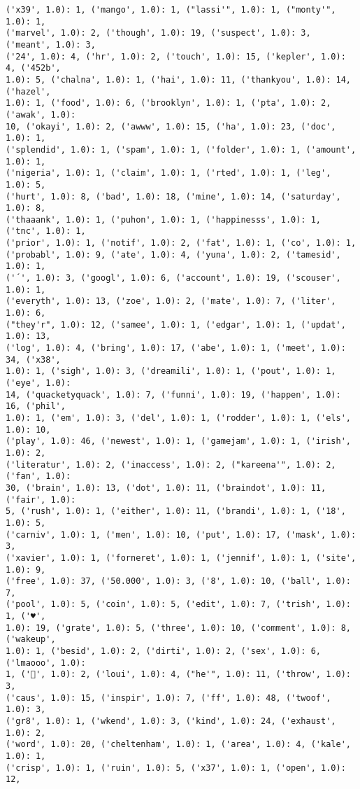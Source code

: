 \documentclass[11pt]{article}
\begin{document}
\begin{Verbatim}[commandchars=\\\{\}]
('x39', 1.0): 1, ('mango', 1.0): 1, ("lassi'", 1.0): 1, ("monty'", 1.0): 1,
('marvel', 1.0): 2, ('though', 1.0): 19, ('suspect', 1.0): 3, ('meant', 1.0): 3,
('24', 1.0): 4, ('hr', 1.0): 2, ('touch', 1.0): 15, ('kepler', 1.0): 4, ('452b',
1.0): 5, ('chalna', 1.0): 1, ('hai', 1.0): 11, ('thankyou', 1.0): 14, ('hazel',
1.0): 1, ('food', 1.0): 6, ('brooklyn', 1.0): 1, ('pta', 1.0): 2, ('awak', 1.0):
10, ('okayi', 1.0): 2, ('awww', 1.0): 15, ('ha', 1.0): 23, ('doc', 1.0): 1,
('splendid', 1.0): 1, ('spam', 1.0): 1, ('folder', 1.0): 1, ('amount', 1.0): 1,
('nigeria', 1.0): 1, ('claim', 1.0): 1, ('rted', 1.0): 1, ('leg', 1.0): 5,
('hurt', 1.0): 8, ('bad', 1.0): 18, ('mine', 1.0): 14, ('saturday', 1.0): 8,
('thaaank', 1.0): 1, ('puhon', 1.0): 1, ('happinesss', 1.0): 1, ('tnc', 1.0): 1,
('prior', 1.0): 1, ('notif', 1.0): 2, ('fat', 1.0): 1, ('co', 1.0): 1,
('probabl', 1.0): 9, ('ate', 1.0): 4, ('yuna', 1.0): 2, ('tamesid', 1.0): 1,
('´', 1.0): 3, ('googl', 1.0): 6, ('account', 1.0): 19, ('scouser', 1.0): 1,
('everyth', 1.0): 13, ('zoe', 1.0): 2, ('mate', 1.0): 7, ('liter', 1.0): 6,
("they'r", 1.0): 12, ('samee', 1.0): 1, ('edgar', 1.0): 1, ('updat', 1.0): 13,
('log', 1.0): 4, ('bring', 1.0): 17, ('abe', 1.0): 1, ('meet', 1.0): 34, ('x38',
1.0): 1, ('sigh', 1.0): 3, ('dreamili', 1.0): 1, ('pout', 1.0): 1, ('eye', 1.0):
14, ('quacketyquack', 1.0): 7, ('funni', 1.0): 19, ('happen', 1.0): 16, ('phil',
1.0): 1, ('em', 1.0): 3, ('del', 1.0): 1, ('rodder', 1.0): 1, ('els', 1.0): 10,
('play', 1.0): 46, ('newest', 1.0): 1, ('gamejam', 1.0): 1, ('irish', 1.0): 2,
('literatur', 1.0): 2, ('inaccess', 1.0): 2, ("kareena'", 1.0): 2, ('fan', 1.0):
30, ('brain', 1.0): 13, ('dot', 1.0): 11, ('braindot', 1.0): 11, ('fair', 1.0):
5, ('rush', 1.0): 1, ('either', 1.0): 11, ('brandi', 1.0): 1, ('18', 1.0): 5,
('carniv', 1.0): 1, ('men', 1.0): 10, ('put', 1.0): 17, ('mask', 1.0): 3,
('xavier', 1.0): 1, ('forneret', 1.0): 1, ('jennif', 1.0): 1, ('site', 1.0): 9,
('free', 1.0): 37, ('50.000', 1.0): 3, ('8', 1.0): 10, ('ball', 1.0): 7,
('pool', 1.0): 5, ('coin', 1.0): 5, ('edit', 1.0): 7, ('trish', 1.0): 1, ('♥',
1.0): 19, ('grate', 1.0): 5, ('three', 1.0): 10, ('comment', 1.0): 8, ('wakeup',
1.0): 1, ('besid', 1.0): 2, ('dirti', 1.0): 2, ('sex', 1.0): 6, ('lmaooo', 1.0):
1, ('😤', 1.0): 2, ('loui', 1.0): 4, ("he'", 1.0): 11, ('throw', 1.0): 3,
('caus', 1.0): 15, ('inspir', 1.0): 7, ('ff', 1.0): 48, ('twoof', 1.0): 3,
('gr8', 1.0): 1, ('wkend', 1.0): 3, ('kind', 1.0): 24, ('exhaust', 1.0): 2,
('word', 1.0): 20, ('cheltenham', 1.0): 1, ('area', 1.0): 4, ('kale', 1.0): 1,
('crisp', 1.0): 1, ('ruin', 1.0): 5, ('x37', 1.0): 1, ('open', 1.0): 12,

\end{Verbatim}
\end{document}
